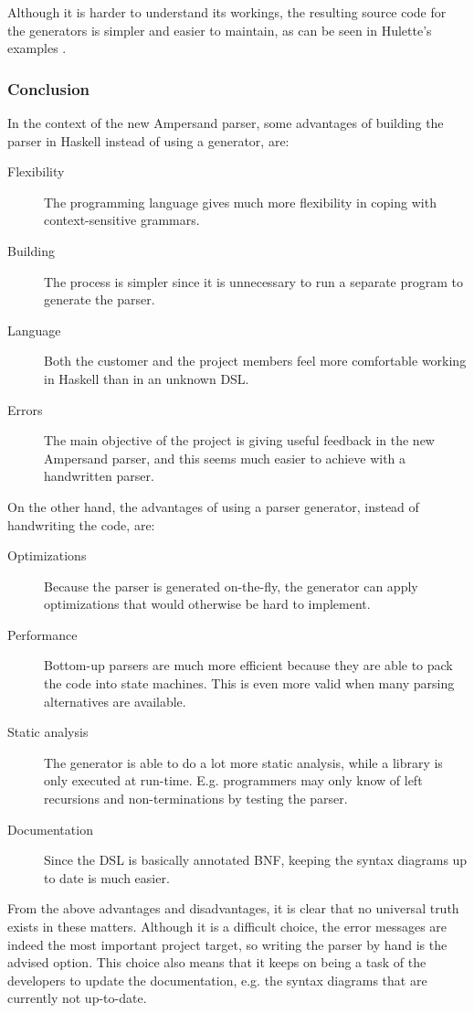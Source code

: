 Although it is harder to understand its workings, the resulting source code for the generators is simpler and easier to maintain, as can be seen in Hulette's examples .

\subsubsection{Conclusion}
In the context of the new Ampersand parser, some advantages of building the parser in Haskell instead of using a generator, are:
\begin{description}
	\item[Flexibility] The programming language gives much more flexibility in coping with context-sensitive grammars.
	\item[Building] The process is simpler since it is unnecessary to run a separate program to generate the parser.
	\item[Language] Both the customer and the project members feel more comfortable working in Haskell than in an unknown DSL.
	\item[Errors] The main objective of the project is giving useful feedback in the new Ampersand parser, and this seems much easier to achieve with a handwritten parser.
\end{description}

\noindent
On the other hand, the advantages of using a parser generator, instead of handwriting the code, are:
\begin{description}
	\item[Optimizations] Because the parser is generated on-the-fly, the generator can apply optimizations that would otherwise be hard to implement.
	\item[Performance] Bottom-up parsers are much more efficient because they are able to pack the code into state machines.
		This is even more valid when many parsing alternatives are available.
	\item[Static analysis] The generator is able to do a lot more static analysis, while a library is only executed at run-time.
    E.g. programmers may only know of left recursions and non-terminations by testing the parser.
	\item[Documentation] Since the DSL is basically annotated BNF, keeping the syntax diagrams up to date is much easier.
\end{description}

\noindent
From the above advantages and disadvantages, it is clear that no universal truth exists in these matters.
Although it is a difficult choice, the error messages are indeed the most important project target, so writing the parser by hand is the advised option.
This choice also means that it keeps on being a task of the developers to update the documentation, e.g. the syntax diagrams that are currently not up-to-date.

